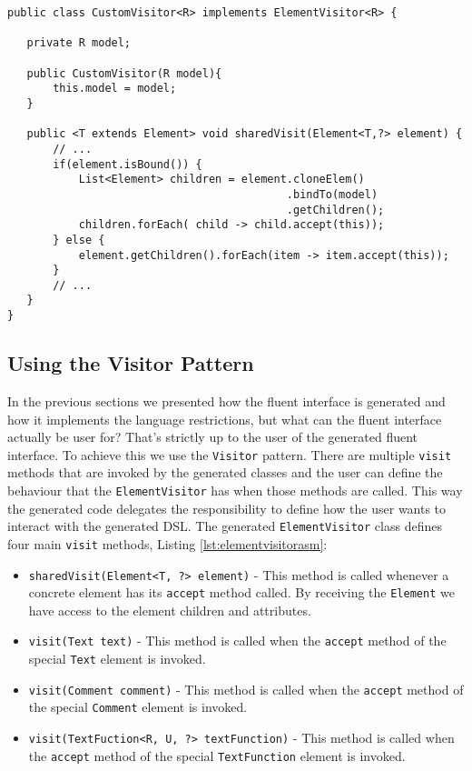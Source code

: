 \bigskip


\begin{minipage}{\linewidth}
\begin{lstlisting}[caption={Visitor with binding support},label={lst:visitorbinding}]
public class CustomVisitor<R> implements ElementVisitor<R> {

   private R model;

   public CustomVisitor(R model){
       this.model = model;
   }
    
   public <T extends Element> void sharedVisit(Element<T,?> element) {
       // ...
       if(element.isBound()) {
           List<Element> children = element.cloneElem()
                                           .bindTo(model)
                                           .getChildren();
           children.forEach( child -> child.accept(this));
       } else {
           element.getChildren().forEach(item -> item.accept(this));
       }
       // ...
   }
}
\end{lstlisting}
\end{minipage}
        
\subsection{Using the Visitor Pattern}
\label{sec:xsdasmvisitor}

In the previous sections we presented how the fluent interface is generated and how it implements the language restrictions, but what can the fluent interface actually be user for? That's strictly up to the user of the generated fluent interface. To achieve this we use the \texttt{Visitor} pattern\citep{gamma1994design}. There are multiple \texttt{visit} methods that are invoked by the generated classes and the user can define the behaviour that the \texttt{ElementVisitor} has when those methods are called. This way the generated code delegates the responsibility to define how the user wants to interact with the generated \ac{DSL}. The generated \texttt{ElementVisitor} class defines four main \texttt{visit} methods, Listing \ref{lst:elementvisitorasm}:

\begin{itemize}
	\item \texttt{sharedVisit(Element<T, ?> element)} - This method is called whenever a concrete element has its \texttt{accept} method called. By receiving the \texttt{Element} we have access to the element children and attributes.
	\item \texttt{visit(Text text)} - This method is called when the \texttt{accept} method of the special \texttt{Text} element is invoked.
	\item \texttt{visit(Comment comment)} - This method is called when the \texttt{accept} method of the special \texttt{Comment} element is invoked.
	\item \texttt{visit(TextFuction<R, U, ?> textFunction)} - This method is called when the \texttt{accept} method of the special \texttt{TextFunction} element is invoked.
\end{itemize}	

